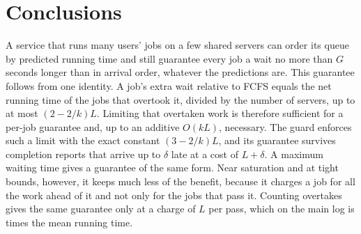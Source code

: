 \section{Conclusions}
\label{sec:conclusions}

A service that runs many users' jobs on a few shared servers can order its queue by
predicted running time and still guarantee every job a wait no more than $G$ seconds longer
than in arrival order, whatever the predictions are. This guarantee follows from one
identity. A job's extra wait relative to FCFS equals the net running time of the jobs that
overtook it, divided by the number of servers, up to at most $(2-2/k)L$. Limiting that
overtaken work is therefore sufficient for a per-job guarantee and, up to an additive
$O(kL)$, necessary. The guard enforces such a limit with the exact constant $(3-2/k)L$, and
its guarantee survives completion reports that arrive up to $\delta$ late at a cost of
$L + \delta$. A maximum waiting time gives a guarantee of the same form. Near saturation
and at tight bounds, however, it keeps much less of the benefit, because it charges a job
for all the work ahead of it and not only for the jobs that pass it. Counting overtakes
gives the same guarantee only at a charge of $L$ per pass, which on the main log is
 times the mean running time.

